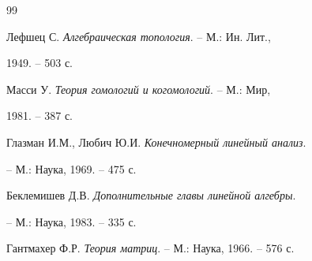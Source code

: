 \begin{thebibliography}{99}


Лефшец С. {\em Алгебраическая топология}. -- М.: Ин. Лит., 


1949. -- 503 с. 


 




Масси У. {\em Теория гомологий и когомологий}. -- М.: Мир, 


1981. -- 387 с. 


 




Глазман И.М., Любич Ю.И. {\em Конечномерный линейный анализ}. 


-- М.: Наука, 1969. -- 475 с. 


 




Беклемишев Д.В. {\em Дополнительные главы линейной алгебры}. 


-- М.: Наука, 1983. -- 335 с. 


 




Гантмахер Ф.Р. {\em Теория матриц}. -- М.: Наука, 1966. -- 576 с. 


 








 










 


\end{thebibliography} 


 


\vskip 2cm 


 






 


 



